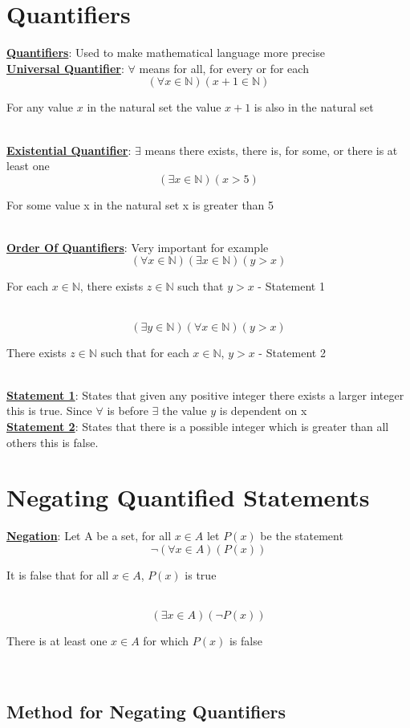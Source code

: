 \documentclass[11pt]{article}
\newcommand{\defline}[2]{\noindent\textbf{\underline{#1}}: #2\\}
\newcommand{\example}[2]{
    \begin{equation}
        #1
    \end{equation}\caption{#2}\\
}
\begin{document}
    \section{Quantifiers}

        \defline{Quantifiers}{Used to make mathematical language more precise}

        \defline{Universal Quantifier}{$\forall$ means for all, for every or for each}

        \example{(\forall x \in \mathbb{N})(x+1\in \mathbb{N})}{For any value $x$ in the natural set the value $x+1$ is also in the natural set}

        \defline{Existential Quantifier}{$\exists$ means there exists, there is, for some, or there is at least one}

        \example{(\exists x\in\mathbb{N})(x > 5)}{For some value x in the natural set x is greater than 5}

        \defline{Order Of Quantifiers}{Very important for example}

        \example{(\forall x \in \mathbb{N})(\exists x\in \mathbb{N})(y>x)}{For each $x\in\mathbb{N}$, there exists $z\in\mathbb{N}$ such that $y>x$ - Statement 1}

        \example{(\exists y\in\mathbb{N})(\forall x\in\mathbb{N})(y>x)}{There exists $z\in\mathbb{N}$ such that for each $x\in\mathbb{N}$, $y>x$ - Statement 2}

        \defline{Statement 1}{States that given any positive integer there exists a larger integer this is true. Since $\forall$ is before $\exists$ the value $y$ is dependent on x}

        \defline{Statement 2}{States that there is a possible integer which is greater than all others this is false.}
    \endsection

    \section{Negating Quantified Statements}
        \defline{Negation}{Let A be a set, for all $x\in A$ let $P(x)$ be the statement}

        \example{\neg(\forall x \in A)(P(x))}{It is false that for all $x\in A$, $P(x)$ is true}

        \example{(\exists x \in A)(\neg P(x))}{There is at least one $x\in A$ for which $P(x)$ is false}

        \subsection{Method for Negating Quantifiers}
\end{document}
